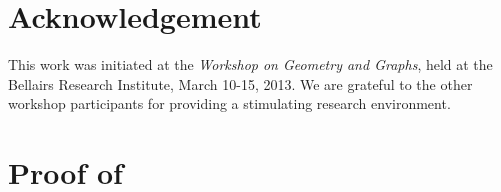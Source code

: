 \documentclass{patmorin}
\begin{document}
\section*{Acknowledgement}

This work was initiated at the \emph{Workshop on Geometry and Graphs},
held at the Bellairs Research Institute, March 10-15, 2013.  We are
grateful to the other workshop participants for providing a stimulating
research environment.





\appendix

\section{Proof of }
\end{document}
